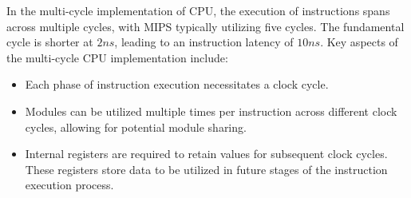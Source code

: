 In the multi-cycle implementation of CPU, the execution of instructions spans across multiple cycles, with MIPS typically utilizing five cycles. 
The fundamental cycle is shorter at $2 ns$, leading to an instruction latency of $10 ns$.
Key aspects of the multi-cycle CPU implementation include:
\begin{itemize}
    \item Each phase of instruction execution necessitates a clock cycle.
    \item Modules can be utilized multiple times per instruction across different clock cycles, allowing for potential module sharing.
    \item Internal registers are required to retain values for subsequent clock cycles. These registers store data to be utilized in future stages of the instruction execution process.
\end{itemize}